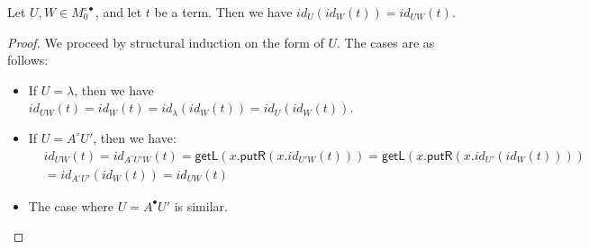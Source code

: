 \documentclass[twoside,11pt,final]{entics}
\newcommand{\getl}{\mathsf{getL}}
\newcommand{\putr}{\mathsf{putR}}
\newcommand{\ex}[1]{{#1}^{\circ\bullet}}
\begin{document}
\begin{lemma}\label{lem:id-property-a}
	Let $U,W \in \ex{M}_0$, and let $t$ be a term. Then we have $id_U(id_W(t)) = id_{UW}(t)$.
\end{lemma}
\begin{proof}
	We proceed by structural induction on the form of $U$. The cases are as follows:
		\begin{itemize}
			\item If $U = \lambda$, then we have $id_{UW}(t) = id_{W}(t) = id_{\lambda}(id_{W}(t)) = id_U(id_W(t))$.
			\item If $U = A^\circ U'$, then we have:
			\begin{align*}
				& id_{UW}(t)
				= id_{A^\circ U' W}(t)
				= \getl(x.\putr(x.id_{U'W}(t)))
				= \getl(x.\putr(x.id_{U'}(id_{W}(t))))
				\\&= id_{A^\circ U'}(id_{W}(t))
				= id_{UW}(t)
			\end{align*}
			\item The case where $U = A^\bullet U'$ is similar.
		\end{itemize}
\end{proof}
\end{document}
